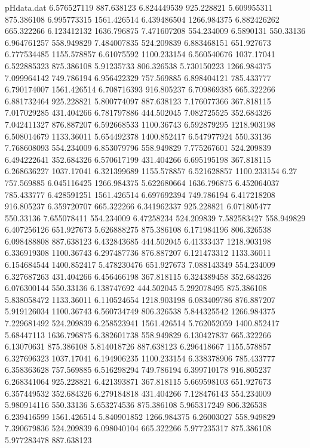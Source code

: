 \begin{filecontents}{pHdata.dat}
6.576527119	887.638123
6.824449539	925.228821
5.609955311	875.386108
6.995773315	1561.426514
6.439486504	1266.984375
6.882426262	665.322266
6.123412132	1636.796875
7.471607208	554.234009
6.5890131	550.33136
6.964761257	558.949829
7.484007835	524.209839
6.883468151	651.927673
6.777534485	1155.578857
6.61075592	1100.233154
6.560540676	1037.17041
6.522885323	875.386108
5.91235733	806.326538
5.730150223	1266.984375
7.099964142	749.786194
6.956422329	757.569885
6.898404121	785.433777
6.790174007	1561.426514
6.708716393	916.805237
6.709869385	665.322266
6.881732464	925.228821
5.800774097	887.638123
7.176077366	367.818115
7.017029285	431.404266
6.781797886	444.502045
7.082725525	352.684326
7.042411327	876.887207
6.592668533	1100.36743
6.592879295	1218.903198
6.508014679	1133.36011
5.654492378	1400.852417
6.547977924	550.33136
7.768608093	554.234009
6.853079796	558.949829
7.775267601	524.209839
6.494222641	352.684326
6.570617199	431.404266
6.695195198	367.818115
6.268636227	1037.17041
6.321399689	1155.578857
6.521628857	1100.233154
6.27	757.569885
6.045116425	1266.984375
5.622680664	1636.796875
6.452064037	785.433777
6.428591251	1561.426514
6.697692394	749.786194
6.417218208	916.805237
6.359720707	665.322266
6.341962337	925.228821
6.071805477	550.33136
7.655078411	554.234009
6.47258234	524.209839
7.582583427	558.949829
6.407256126	651.927673
5.626888275	875.386108
6.171984196	806.326538
6.098488808	887.638123
6.432843685	444.502045
6.41333437	1218.903198
6.336919308	1100.36743
6.297487736	876.887207
6.121473312	1133.36011
6.154684544	1400.852417
5.478230476	651.927673
7.088143349	554.234009
6.327687263	431.404266
6.456466198	367.818115
6.324389458	352.684326
6.076300144	550.33136
6.138747692	444.502045
5.292078495	875.386108
5.838058472	1133.36011
6.110524654	1218.903198
6.083409786	876.887207
5.919126034	1100.36743
6.560734749	806.326538
5.844325542	1266.984375
7.229681492	524.209839
6.258523941	1561.426514
5.762052059	1400.852417
5.68447113	1636.796875
6.382601738	558.949829
6.130427837	665.322266
6.13070631	875.386108
5.814018726	887.638123
6.296418667	1155.578857
6.327696323	1037.17041
6.194906235	1100.233154
6.338378906	785.433777
6.358363628	757.569885
6.516298294	749.786194
6.399710178	916.805237
6.268341064	925.228821
6.421393871	367.818115
5.669598103	651.927673
6.357449532	352.684326
6.279184818	431.404266
7.128476143	554.234009
5.980914116	550.33136
5.653274536	875.386108
5.965317249	806.326538
6.239416599	1561.426514
5.840901852	1266.984375
6.26003027	558.949829
7.390679836	524.209839
6.098040104	665.322266
5.977235317	875.386108
5.977283478	887.638123

\end{filecontents}
